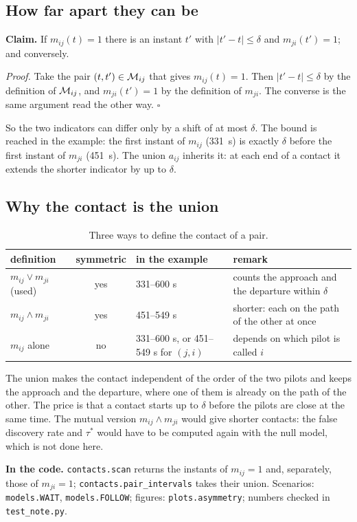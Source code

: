 \subsection{How far apart they can be}

\textbf{Claim.} If $m_{ij}(t)=1$ there is an instant $t'$ with $|t'-t|\le\delta$ and $m_{ji}(t')=1$;
and conversely.

\emph{Proof.} Take the pair $(t,t')\in\mathcal{M}_{ij}$ that gives $m_{ij}(t)=1$. Then $|t'-t|\le\delta$ by
the definition of $\mathcal{M}_{ij}$, and $m_{ji}(t')=1$ by the definition of $m_{ji}$. The converse is the
same argument read the other way. \hfill$\square$

So the two indicators can differ only by a shift of at most $\delta$. The bound is reached in the
example: the first instant of $m_{ij}$ (331~s) is exactly $\delta$ before the first instant of
$m_{ji}$ (451~s). The union $a_{ij}$ inherits it: at each end of a contact it extends the shorter
indicator by up to $\delta$.

\subsection{Why the contact is the union}

\begin{table}[htbp]
\centering\footnotesize
\begin{tabular}{@{}l c l l@{}}
\toprule
definition & symmetric & in the example & remark \\
\midrule
$m_{ij}\vee m_{ji}$ (used) & yes & 331--600 s & counts the approach and the departure within $\delta$ \\
$m_{ij}\wedge m_{ji}$ & yes & 451--549 s & shorter: each on the path of the other at once \\
$m_{ij}$ alone & no & 331--600 s, or 451--549 s for $(j,i)$ & depends on which pilot is called $i$ \\
\bottomrule
\end{tabular}
\caption{Three ways to define the contact of a pair.}
\label{tab:asym-union}
\end{table}

The union makes the contact independent of the order of the two pilots and keeps the approach and
the departure, where one of them is already on the path of the other. The price is that a contact
starts up to $\delta$ before the pilots are close at the same time. The mutual version
$m_{ij}\wedge m_{ji}$ would give shorter contacts: the false discovery rate and $\tau^*$ would have
to be computed again with the null model, which is not done here.

\textbf{In the code.} \texttt{contacts.scan} returns the instants of $m_{ij}=1$ and, separately,
those of $m_{ji}=1$; \texttt{contacts.pair\_\allowbreak intervals} takes their union. Scenarios:
\texttt{models.WAIT}, \texttt{models.FOLLOW}; figures: \texttt{plots.asymmetry}; numbers checked
in \texttt{test\_note.py}.
